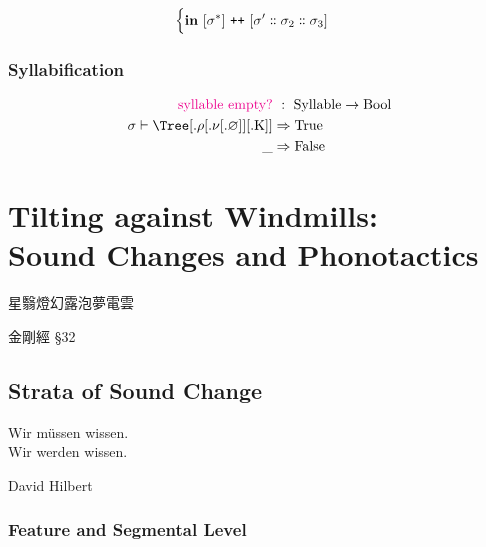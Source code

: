 \documentclass{report}[12pt]
\begin{document}
\begin{align*}
\begin{cases}
\begin{aligned}
                                                                                                               & \textbf{in}\ [\sigma^{*}]\ \texttt{++}\ [\sigma' \dblcolon \sigma_2 \dblcolon \sigma_3] \\
                                                                                                             \end{aligned} \\
                                                                                \end{cases}
\end{align*}

\subsection{Syllabification}

\begin{align*}
  \text{\textcolor{magenta}{syllable empty?}} &\ :\ \text{Syllable} \rightarrow \text{Bool} \\
  \sigma \vdash \Tree [.\text{$\rho$} [.\text{$\nu$} [.\text{$\varnothing$} ] ] [.\text{K} ] ] & \Rightarrow \text{True} \\
  \_ & \Rightarrow \text{False} \\
\end{align*}

\chapter{Tilting against Windmills: \\ Sound Changes and Phonotactics}

\epigraph{星翳燈幻露泡夢電雲\footnotemark}{金剛經 \S32}

\section{Strata of Sound Change}

\epigraph{Wir m\"{u}ssen wissen. \\ Wir werden wissen.}{David Hilbert}

\subsection{Feature and Segmental Level}
\end{document}
